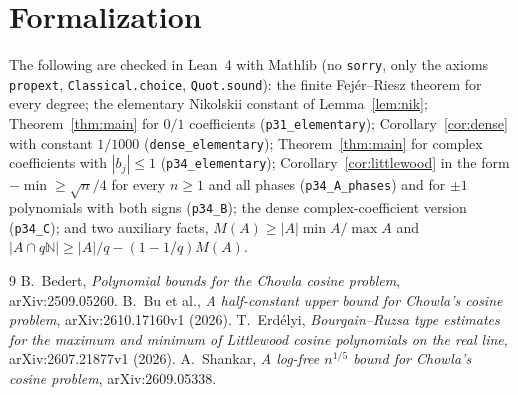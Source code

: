 \documentclass[11pt]{amsart}
\theoremstyle{remark}
\newcommand{\N}{\mathbb{N}}
\begin{document}
\section{Formalization}
The following are checked in Lean~4 with Mathlib (no \texttt{sorry}, only the axioms \texttt{propext},
\texttt{Classical.choice}, \texttt{Quot.sound}): the finite Fej\'er--Riesz theorem for every degree; the elementary
Nikolskii constant of Lemma~\ref{lem:nik}; Theorem~\ref{thm:main} for $0/1$ coefficients (\texttt{p31\_elementary});
Corollary~\ref{cor:dense} with constant $1/1000$ (\texttt{dense\_elementary}); Theorem~\ref{thm:main} for complex
coefficients with $|b_j|\le1$ (\texttt{p34\_elementary}); Corollary~\ref{cor:littlewood} in the form
$-\min\ge\sqrt n/4$ for every $n\ge1$ and all phases (\texttt{p34\_A\_phases}) and for $\pm1$ polynomials with both
signs (\texttt{p34\_B}); the dense complex-coefficient version (\texttt{p34\_C}); and two auxiliary facts,
$M(A)\ge|A|\min A/\max A$ and $|A\cap q\N|\ge|A|/q-(1-1/q)M(A)$.

\begin{thebibliography}{9}
 B.~Bedert, \emph{Polynomial bounds for the Chowla cosine problem}, arXiv:2509.05260.
 B.~Bu et al., \emph{A half-constant upper bound for Chowla's cosine problem}, arXiv:2610.17160v1 (2026).
 T.~Erd\'elyi, \emph{Bourgain--Ruzsa type estimates for the maximum and minimum of Littlewood cosine
polynomials on the real line}, arXiv:2607.21877v1 (2026).
 A.~Shankar, \emph{A log-free $n^{1/5}$ bound for Chowla's cosine problem}, arXiv:2609.05338.
\end{thebibliography}
\end{document}
